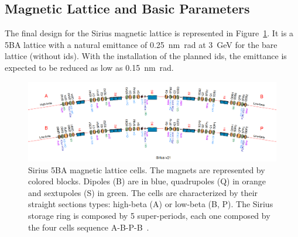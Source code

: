 \subsection{Magnetic Lattice and Basic Parameters}
The final design for the Sirius magnetic lattice is represented in Figure~\ref{fig:sirius_lattice}. It is a 5BA lattice with a natural emittance of \SI{0.25}{\nano\meter\radian} at \SI{3}{\giga\electronvolt} for the bare lattice (without \glspl{id}). With the installation of the planned \glspl{id}, the emittance is expected to be reduced as low as \SI{0.15}{\nano\meter\radian}.
\begin{figure}
    \centering
    \includegraphics[scale=0.27, trim={0 2cm 0 0}, clip]{figures/sirius_lattice.png}
    \caption{Sirius 5BA magnetic lattice cells. The magnets are represented by colored blocks. Dipoles (B) are in blue, quadrupoles (Q) in orange and sextupoles (S) in green. The cells are characterized by their straight sections types: high-beta (A) or low-beta (B, P). The Sirius storage ring is composed by 5 super-periods, each one composed by the four cells sequence A-B-P-B~\cite{wiki}.}
    \label{fig:sirius_lattice}
\end{figure}

